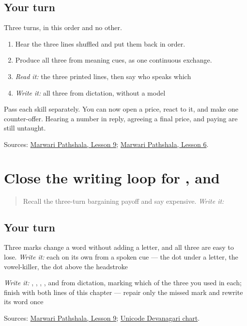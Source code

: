 \subsection*{Your turn}
Three turns, in this order and no other.

\begin{enumerate}
\raggedright
  \item Hear the three lines shuffled and put them back in order.
  \item Produce all three from meaning cues, as one continuous exchange.
  \item \emph{Read it:} the three printed lines, then say who speaks which
  \item \emph{Write it:} all three from dictation, without a model
\end{enumerate}

Pass each skill separately. You can now open a price, react to it, and make one counter-offer. Hearing a number in reply, agreeing a final price, and paying are still untaught.

\begin{tcolorbox}[breakable,colback=teal!4,colframe=teal!35!black,title={Before you move on}]
Sources: \href{https://www.marwaripathshala.com/marwari-lesson-9-english}{Marwari Pathshala, Lesson 9}; \href{https://www.marwaripathshala.com/marwari-lesson-6-english}{Marwari Pathshala, Lesson 6}.
\end{tcolorbox}
\section[Practice]{Close the writing loop for ,  and }

\label{lesson:MW-R23-script-close}



\begin{quote}
Recall the three-turn bargaining payoff and say expensive. \emph{Write it:} \textbf{}
\end{quote}

\subsection*{Your turn}
Three marks change a word without adding a letter, and all three are easy to lose. \emph{Write it:} each on its own from a spoken cue — the dot under a letter, the vowel-killer, the dot above the headstroke

\emph{Write it:} \textbf{}, \textbf{}, \textbf{}, \textbf{}, and \textbf{} from dictation, marking which of the three you used in each; finish with both lines of this chapter — repair only the missed mark and rewrite its word once

\begin{tcolorbox}[breakable,colback=teal!4,colframe=teal!35!black,title={Before you move on}]
Sources: \href{https://www.marwaripathshala.com/marwari-lesson-9-english}{Marwari Pathshala, Lesson 9}; \href{https://www.unicode.org/charts/PDF/U0900.pdf}{Unicode Devanagari chart}.
\end{tcolorbox}
